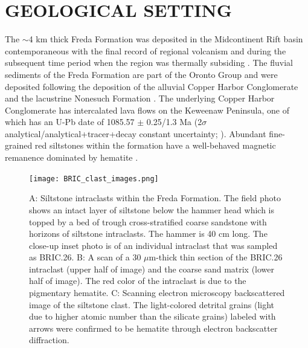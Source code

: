 \documentclass[11pt,letterpaper]{article}
\begin{document}
\section*{GEOLOGICAL SETTING}

The $\sim$4 km thick Freda Formation was deposited in the Midcontinent Rift basin contemporaneous with the final record of regional volcanism and during the subsequent time period when the region was thermally subsiding \citep{Cannon1992a}. The fluvial sediments of the Freda Formation are part of the Oronto Group and were deposited following the deposition of the alluvial Copper Harbor Conglomerate and the lacustrine Nonesuch Formation \citep{Ojakangas2001a}. The underlying Copper Harbor Conglomerate has intercalated lava flows on the Keweenaw Peninsula, one of which has an U-Pb date of 1085.57 $\pm$ 0.25/1.3 Ma (2$\sigma$ analytical/analytical+tracer+decay constant uncertainty; \citealp{Fairchild2017a}). Abundant fine-grained red siltstones within the formation have a well-behaved magnetic remanence dominated by hematite \citep{Henry1977a}.

\begin{figure}[!ht]
\centering
\noindent\texttt{[image: BRIC\_clast\_images.png]}
\caption{\small{A: Siltstone intraclasts within the Freda Formation. The field photo shows an intact layer of siltstone below the hammer head which is topped by a bed of trough cross-stratified coarse sandstone with horizons of siltstone intraclasts. The hammer is 40 cm long. The close-up inset photo is of an individual intraclast that was sampled as BRIC.26. B: A scan of a 30 $\mu$m-thick thin section of the BRIC.26 intraclast (upper half of image) and the coarse sand matrix (lower half of image). The red color of the intraclast is due to the pigmentary hematite. C: Scanning electron microscopy backscattered image of the siltstone clast. The light-colored detrital grains (light due to higher atomic number than the silicate grains) labeled with arrows were confirmed to be hematite through electron backscatter diffraction.}}
\label{fig:intraclast_images}
\end{figure} 
\end{document}
